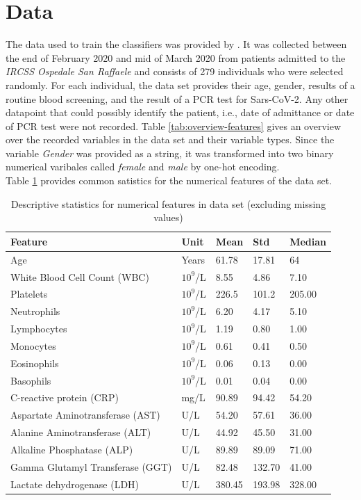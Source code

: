 \section{Data}
The data used to train the classifiers was provided by \citeauthor{RN127} \cite{RN127}. 
It was collected between the end of February 2020 and mid of March 2020 from patients admitted to the \textit{IRCSS Ospedale San Raffaele} and consists of 279 individuals who were selected randomly.
For each individual, the data set provides their age, gender, results of a 
routine blood screening, and the result of a PCR test for Sars-CoV-2.
Any other datapoint that could possibly identify the patient, i.e., date of 
admittance or date of PCR test were not recorded.
Table \ref{tab:overview-features} gives an overview over the recorded variables 
in the data set and their variable types. Since the variable \textit{Gender} 
was provided as a string, it was transformed into two binary numerical 
varibales called \textit{female} and \textit{male} by one-hot encoding.
\\
Table \ref{tab:feature-dist} provides common satistics for the numerical 
features of the data set.
\begin{table}[ht]
\centering
\begin{tabular}{lllll}
Feature                          & Unit                    & Mean   & Std    & 
Median \\ \hline
Age                              & Years                   & 61.78  & 17.81  & 
64     \\
White Blood Cell Count (WBC)     & $10^9$/L & 8.55   & 4.86   & 
7.10   \\
Platelets                        & $10^9$/L & 226.5  & 101.2  & 
205.00 \\
Neutrophils                      & $10^9$/L & 6.20   & 4.17   & 
5.10   \\
Lymphocytes                      & $10^9$/L & 1.19   & 0.80   & 
1.00   \\
Monocytes                        & $10^9$/L & 0.61   & 0.41   & 
0.50   \\
Eosinophils                      & $10^9$/L & 0.06   & 0.13   & 
0.00   \\
Basophils                        & $10^9$/L & 0.01   & 0.04   & 
0.00   \\
C-reactive protein (CRP)         & mg/L                    & 90.89  & 94.42  & 
54.20  \\
Aspartate Aminotransferase (AST) & U/L                     & 54.20  & 57.61  & 
36.00  \\
Alanine Aminotransferase (ALT)   & U/L                     & 44.92  & 45.50  & 
31.00  \\
Alkaline Phosphatase (ALP)       & U/L                     & 89.89  & 89.09  & 
71.00  \\
Gamma Glutamyl Transferase (GGT) & U/L                     & 82.48  & 132.70 & 
41.00  \\
Lactate dehydrogenase (LDH)      & U/L                     & 380.45 & 193.98 & 
328.00
\end{tabular}
\caption{Descriptive statistics for numerical features in data set (excluding 
missing values)}
\label{tab:feature-dist}
\end{table}

